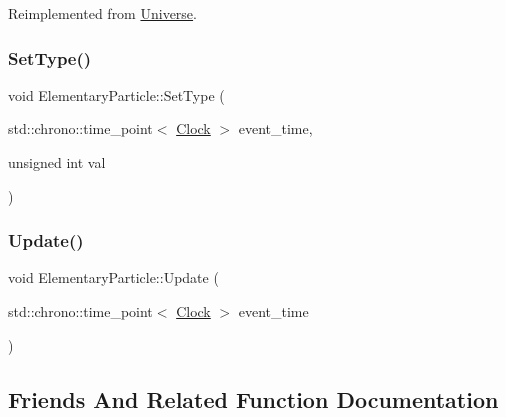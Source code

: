 Reimplemented from \mbox{\hyperlink{classUniverse_ae2ae1c3b3e4cde2c18f5f6a814761ec8}{Universe}}.

\mbox{\label{classElementaryParticle_a37d7718faf6be68d4374bcc56816f30a}} 
\subsubsection{\texorpdfstring{Set\+Type()}{SetType()}}
{\footnotesize\ttfamily void Elementary\+Particle\+::\+Set\+Type (\begin{DoxyParamCaption}\item[{std\+::chrono\+::time\+\_\+point$<$ \mbox{\hyperlink{universe_8h_a0ef8d951d1ca5ab3cfaf7ab4c7a6fd80}{Clock}} $>$}]{event\+\_\+time,  }\item[{unsigned int}]{val }\end{DoxyParamCaption})\hspace{0.3cm}{\ttfamily [inline]}}

\mbox{\label{classElementaryParticle_af37afad11f5602f1a943b6e88a728b07}} 
\subsubsection{\texorpdfstring{Update()}{Update()}}
{\footnotesize\ttfamily void Elementary\+Particle\+::\+Update (\begin{DoxyParamCaption}\item[{std\+::chrono\+::time\+\_\+point$<$ \mbox{\hyperlink{universe_8h_a0ef8d951d1ca5ab3cfaf7ab4c7a6fd80}{Clock}} $>$}]{event\+\_\+time }\end{DoxyParamCaption})}



\subsection{Friends And Related Function Documentation}
\mbox{\label{classElementaryParticle_a9bc6eb2a4c20ce83728a7c9a31b91f19}} 
